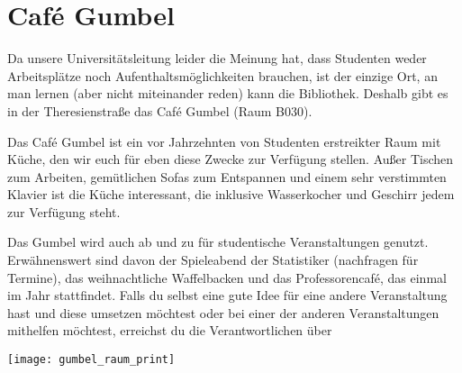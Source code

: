﻿
\chapter{Café Gumbel}

Da unsere Universitätsleitung leider die Meinung hat, dass Studenten weder Arbeitsplätze noch Aufenthaltsmöglichkeiten brauchen, ist der einzige Ort, an man lernen (aber nicht miteinander reden) kann die Bibliothek. Deshalb gibt es in der Theresienstraße das Café Gumbel (Raum B030).

Das Café Gumbel ist ein vor Jahrzehnten von Studenten erstreikter Raum mit Küche, den wir euch für eben diese Zwecke zur Verfügung stellen. Außer Tischen zum Arbeiten, gemütlichen Sofas zum Entspannen und einem sehr verstimmten Klavier ist die Küche interessant, die inklusive Wasserkocher und Geschirr jedem zur Verfügung steht.

Das Gumbel wird auch ab und zu für studentische Veranstaltungen genutzt. Erwähnenswert sind davon der Spieleabend der Statistiker (nachfragen für Termine), das weihnachtliche Waffelbacken und das Professorencafé, das einmal im Jahr stattfindet.
Falls du selbst eine gute Idee für eine andere Veranstaltung hast und diese umsetzen möchtest oder bei einer der anderen Veranstaltungen mithelfen möchtest, erreichst du die Verantwortlichen über 

\skiptobottom
\texttt{[image: gumbel\_raum\_print]}
